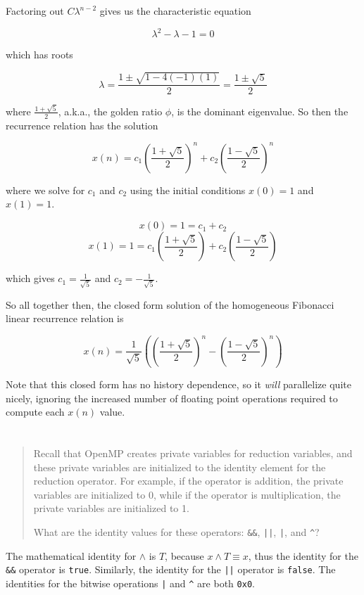 \documentclass{article}
\begin{document}
   Factoring out $C\lambda^{n - 2}$ gives us the characteristic equation

   \[ \lambda^2 - \lambda - 1 = 0 \]

   which has roots

   \[ \lambda = \frac{1 \pm \sqrt{1 - 4(-1)(1)}}{2} = \frac{1 \pm \sqrt{5}}{2} \]

   where $\frac{1 + \sqrt{5}}{2}$, a.k.a., the golden ratio $\phi$, is the dominant eigenvalue. So then the recurrence relation has the solution

   \[ x(n) = c_1 {\left(\frac{1 + \sqrt{5}}{2}\right)}^n + c_2 {\left(\frac{1 - \sqrt{5}}{2}\right)}^n \]

   where we solve for $c_1$ and $c_2$ using the initial conditions $x(0) = 1$ and $x(1) = 1$.

   \[ x(0) = 1 = c_1 + c_2 \]
   \[ x(1) = 1 = c_1 \left( \frac{1 + \sqrt{5}}{2} \right) + c_2 \left( \frac{1 - \sqrt{5}}{2} \right) \]

   which gives $c_1 = \frac{1}{\sqrt{5}}$ and $c_2 = - \frac{1}{\sqrt{5}}$.

   So all together then, the closed form solution of the homogeneous Fibonacci linear recurrence relation is

   \[x(n) = \frac{1}{\sqrt{5}} \left( {\left( \frac{1 + \sqrt{5}}{2} \right)}^n - {\left( \frac{1 - \sqrt{5}}{2} \right)}^n \right)\]

   Note that this closed form has no history dependence, so it \textit{will} parallelize quite nicely, ignoring the increased number of floating point operations required to compute each $x(n)$ value.


\section{}
    \begin{quote}
        Recall that OpenMP creates private variables for reduction variables, and these private variables are initialized to the identity element for the reduction operator. For example, if the operator is addition, the private variables are initialized to 0, while if the operator is multiplication, the private variables are initialized to 1.

        What are the identity values for these operators: \texttt{&&}, \texttt{||}, \texttt{|}, and \texttt{^}?
    \end{quote}

    The mathematical identity for $\land$ is $T$, because $x \land T \equiv x$, thus the identity for the \texttt{&&} operator is \texttt{true}. Similarly, the identity for the \texttt{||} operator is \texttt{false}. The identities for the bitwise operations \texttt{|} and \texttt{^} are both \texttt{0x0}.
\end{document}
